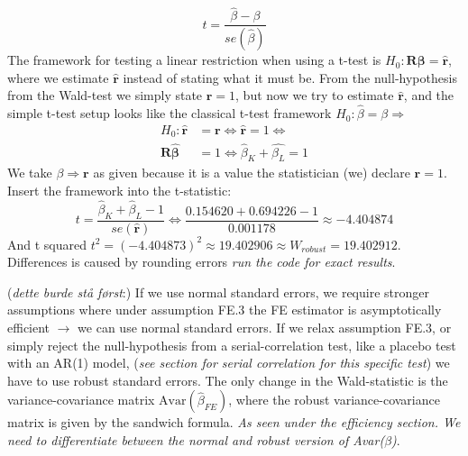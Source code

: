\begin{equation*}
    t=\frac{\hat{\beta}-\beta}{se(\hat{\beta})}
\end{equation*}
The framework for testing a linear restriction when using a t-test is $H_0:\textbf{R}\boldsymbol{\beta}=\hat{\textbf{r}}$, where we estimate $\hat{\textbf{r}}$ instead of stating what it must be. From the null-hypothesis from the Wald-test we simply state $\textbf{r}=1$, but now we try to estimate $\hat{\textbf{r}}$, and the simple t-test setup looks like the classical t-test framework $H_0: \hat{\beta}=\beta\Rightarrow$
\begin{align*}
    H_0:\hat{\textbf{r}}&=\textbf{r}\Leftrightarrow \hat{\textbf{r}}=1\Leftrightarrow  \\
     \textbf{R}\boldsymbol{\hat{\beta}}&=1\Leftrightarrow \hat{\beta}_K+\hat{\beta_L}=1
\end{align*}
We take $\beta\Rightarrow \textbf{r}$ as given because it is a value the statistician (we) declare $\textbf{r}=1$. Insert the framework into the t-statistic:
\begin{equation*}
    t=\frac{\hat{\beta}_K+\hat{\beta}_L-1}{se(\hat{\textbf{r}})}
    \Leftrightarrow \frac{0.154620+0.694226-1}{0.001178}\approx-4.404874
\end{equation*}
And t squared $t^2=(-4.404873)^2\approx19.402906\approx W_{robust}=19.402912$. Differences is caused by rounding errors \textit{run the code for exact results}.

(\textit{dette burde stå først}:) If we use normal standard errors, we require stronger assumptions where under assumption FE.3 the FE estimator is asymptotically efficient $\rightarrow$ we can use normal standard errors. If we relax assumption FE.3, or simply reject the null-hypothesis from a serial-correlation test, like a placebo test with an AR(1) model, (\textit{see section for serial correlation for this specific test}) we have to use robust standard errors. The only change in the Wald-statistic is the variance-covariance matrix $\text{Avar}(\hat{\beta}_{FE})$, where the robust variance-covariance matrix is given by the sandwich formula. \newline
\textit{As seen under the efficiency section. We need to differentiate between the normal and robust version of Avar($\beta$)}.



